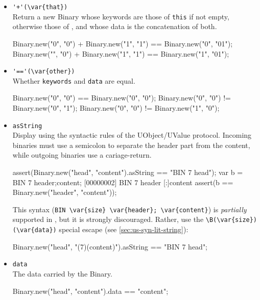 \begin{itemize}
\item \lstinline|'+'(\var{that})|\\
  Return a new Binary whose keywords are those of \lstinline|this| if
  not empty, otherwise those of , and whose data is the
  concatenation of both.
\begin{urbiassert}[firstnumber=last]
Binary.new("0", "0") + Binary.new("1", "1")
       == Binary.new("0", "01");
Binary.new("", "0") + Binary.new("1", "1")
       == Binary.new("1", "01");
\end{urbiassert}

\item \lstinline|'=='(\var{other})|\\
  Whether \lstinline|keywords| and \lstinline|data| are equal.
\begin{urbiassert}[firstnumber=last]
Binary.new("0", "0") == Binary.new("0", "0");
Binary.new("0", "0") != Binary.new("0", "1");
Binary.new("0", "0") != Binary.new("1", "0");
\end{urbiassert}

\item \lstinline|asString|\\
  Display using the syntactic rules of the UObject/UValue protocol.
  Incoming binaries must use a semicolon to separate the header part
  from the content, while outgoing binaries use a cariage-return.
\begin{urbiscript}[firstnumber=last]
assert(Binary.new("head", "content").asString
       == "BIN 7 head\ncontent");
var b = BIN 7 header;content;
[00000002] BIN 7 header
[:]content
assert(b == Binary.new("header", "content"));
\end{urbiscript}

This syntax (\lstinline|BIN \var{size} \var{header}; \var{content}|)
is \emph{partially} supported in \us, but it is strongly discouraged.
Rather, use the \lstinline|\B(\var{size})(\var{data})| special escape
(see \autoref{sec:us-syn-lit-string}):

\begin{urbiassert}[firstnumber=last]
Binary.new("head", "\B(7)(content)").asString
       == "BIN 7 head\ncontent";
\end{urbiassert}


\item \lstinline|data|\\
  The data carried by the Binary.
\begin{urbiassert}[firstnumber=last]
Binary.new("head", "content").data == "content";
\end{urbiassert}


\end{itemize}
